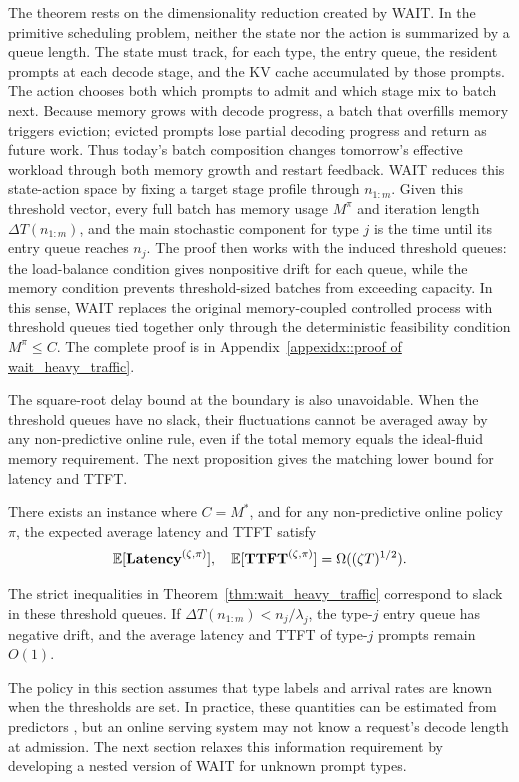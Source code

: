 The theorem rests on the dimensionality reduction created by WAIT. In the primitive scheduling problem, neither the state nor the action is summarized by a queue length. The state must track, for each type, the entry queue, the resident prompts at each decode stage, and the KV cache accumulated by those prompts. The action chooses both which prompts to admit and which stage mix to batch next. Because memory grows with decode progress, a batch that overfills memory triggers eviction; evicted prompts lose partial decoding progress and return as future work. Thus today's batch composition changes tomorrow's effective workload through both memory growth and restart feedback. WAIT reduces this state-action space by fixing a target stage profile through \(n_{1:m}\). Given this threshold vector, every full batch has memory usage \(M^\pi\) and iteration length \(\Delta T(n_{1:m})\), and the main stochastic component for type \(j\) is the time until its entry queue reaches \(n_j\). The proof then works with the induced threshold queues: the load-balance condition gives nonpositive drift for each queue, while the memory condition prevents threshold-sized batches from exceeding capacity. In this sense, WAIT replaces the original memory-coupled controlled process with threshold queues tied together only through the deterministic feasibility condition \(M^\pi\le C\). The complete proof is in Appendix~\ref{appexidx::proof of wait_heavy_traffic}.

The square-root delay bound at the boundary is also unavoidable. When the threshold queues have no slack, their fluctuations cannot be averaged away by any non-predictive online rule, even if the total memory equals the ideal-fluid memory requirement. The next proposition gives the matching lower bound for latency and TTFT.
\begin{proposition}\label{prop::simple random walk, tight bound}
There exists an instance where \( C = M^* \), and for any non-predictive online policy \(\pi\), the expected average latency and TTFT satisfy
\[
\mathbb{E}[\textbf{Latency}^{(\zeta,\pi)}],\quad \mathbb{E}[\textbf{TTFT}^{(\zeta,\pi)}] = \Omega((\zeta T)^{1/2}).
\]
\end{proposition}
The strict inequalities in Theorem~\ref{thm:wait_heavy_traffic} correspond to slack in these threshold queues. If \(\Delta T(n_{1:m})<n_j/\lambda_j\), the type-\(j\) entry queue has negative drift, and the average latency and TTFT of type-\(j\) prompts remain \(O(1)\).

The policy in this section assumes that type labels and arrival rates are known when the thresholds are set. In practice, these quantities can be estimated from predictors \citep{fu2025efficient}, but an online serving system may not know a request's decode length at admission. The next section relaxes this information requirement by developing a nested version of WAIT for unknown prompt types.

